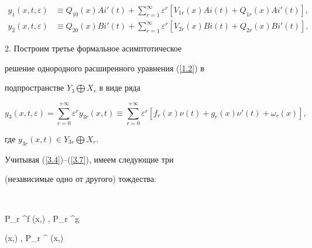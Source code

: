 \begin{equation}


\label{4.9}


\begin{split}


y_{1} (x, t, \varepsilon) &\equiv Q_{10} (x)Ai' (t) + \sum_{r =


1}^{\infty} \varepsilon^r [V_{1 r}(x) A i(t) +


Q_{1 r}(x) A i' (t)],\\


%


y_{2} (x, t, \varepsilon) &\equiv Q_{20} (x) B i' (t) +


\sum _{r = 1}^{\infty} \varepsilon^r [V_{2


r}(x) B i (t) + Q_{2 r}(x) B i' (t)]. 


\end{split}


\end{equation}





2. Построим третье формальное асимптотическое


решение однородного расширенного уравнения (\ref{1.2}) в


подпространстве $Y_3 \bigoplus X_r$ в виде ряда


\begin{equation}


\label{4.10}


y_3 (x, t, \varepsilon) = \sum_{r =


0}^{+\infty} \varepsilon^r y_{3r} (x, t) \equiv \sum_{r


= 0}^{+\infty} \varepsilon^r [ f_{r} (x) \nu


({t}) + g_{r} ({x}) \nu ' ({t}) + \omega_r (x) ],


\end{equation}


где $y_{3r} (x,t) \in Y_{3r} \bigoplus X_r $.





Учитывая (\ref{3.4})--(\ref{3.7}), имеем следующие три


(независимые одно от другого) тождества:


$$


P_r ^{f} (x,\varepsilon) , \quad P_r ^{g}


(x,\varepsilon) , \quad P_r ^{\omega} (x,\varepsilon)



